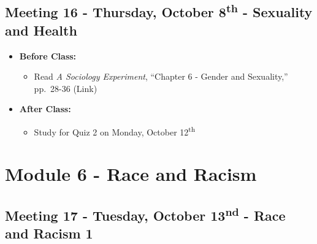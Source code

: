 \documentclass[
]{book}
\providecommand{\tightlist}{%
  \setlength{\itemsep}{0pt}\setlength{\parskip}{0pt}}
\begin{document}
\hypertarget{meeting-16---thursday-october-8th---sexuality-and-health}{%
\subsection*{\texorpdfstring{Meeting 16 - Thursday, October 8\textsuperscript{th} - Sexuality and Health}{Meeting 16 - Thursday, October 8th - Sexuality and Health}}\label{meeting-16---thursday-october-8th---sexuality-and-health}}

\begin{itemize}
\tightlist
\item
  \textbf{Before Class:}

  \begin{itemize}
  \tightlist
  \item
    Read \emph{A Sociology Experiment}, ``Chapter 6 - Gender and Sexuality,'' pp.~28-36 (Link)
  \end{itemize}
\item
  \textbf{After Class:}

  \begin{itemize}
  \tightlist
  \item
    Study for Quiz 2 on Monday, October 12\textsuperscript{th}
  \end{itemize}
\end{itemize}

\newpage

\hypertarget{module-6---race-and-racism}{%
\section{Module 6 - Race and Racism}\label{module-6---race-and-racism}}

\hypertarget{meeting-17---tuesday-october-13nd---race-and-racism-1}{%
\subsection*{\texorpdfstring{Meeting 17 - Tuesday, October 13\textsuperscript{nd} - Race and Racism 1}{Meeting 17 - Tuesday, October 13nd - Race and Racism 1}}\label{meeting-17---tuesday-october-13nd---race-and-racism-1}}
\end{document}
